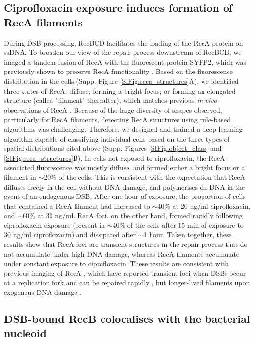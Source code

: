 \subsection*{Ciprofloxacin exposure induces formation of RecA filaments}
During DSB processing, RecBCD facilitates the loading of the RecA protein on ssDNA. To broaden our view of the repair process down\-stream of RecBCD, we imaged a tandem fusion of RecA with the fluorescent protein SYFP2, which was previously shown to preserve RecA functionality \cite{Wiktor2021}. Based on the fluorescence distribution in the cells (Supp. Figure \ref{SIFig:reca_structures}A), we identified three states of RecA: diffuse; forming a bright focus; or forming an elongated structure (called "filament" thereafter), which matches previous \emph{in vivo} observations of RecA \cite{Wiktor2021}. Because of the large diversity of shapes observed, particularly for RecA filaments, detecting RecA structures using rule-based algorithms was challenging. Therefore, we designed and trained a deep-learning algorithm capable of classifying individual cells based on the three types of spatial distributions cited above (Supp. Figures \ref{SIFig:object_class} and \ref{SIFig:reca_structures}B). In cells not exposed to ciprofloxacin, the RecA-associated fluorescence was mostly diffuse, and formed either a bright focus or a filament in $\sim$20\% of the cells. This is consistent with the expectation that RecA diffuses freely in the cell without DNA damage, and polymerises on DNA in the event of an endogenous DSB. After one hour of exposure, the proportion of cells that contained a RecA filament had increased to $\sim$40\% at 20 ng/ml ciprofloxacin, and $\sim$60\% at 30 ng/ml. RecA foci, on the other hand, formed rapidly following ciprofloxacin exposure (present in $\sim$40\% of the cells after 15 min of exposure to 30 ng/ml ciprofloxacin) and dissipated after $\sim$1 hour. Taken together, these results show that RecA foci are transient structures in the repair process that do not accumulate under high DNA damage, whereas RecA filaments accumulate under constant exposure to ciprofloxacin. These results are consistent with previous imaging of RecA \cite{Lesterlin2013, Amarh2018, Ghodke2019, Wiktor2021}, which have reported transient foci when DSBs occur at a replication fork and can be repaired rapidly \cite{Amarh2018}, but longer-lived filaments upon exogenous DNA damage \cite{Lesterlin2013, Ghodke2019, Wiktor2021}.

\subsection*{DSB-bound RecB colocalises with the bacterial nucleoid}

